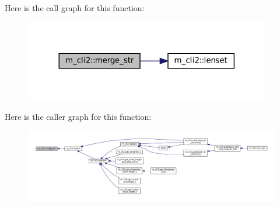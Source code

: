 Here is the call graph for this function\+:
\nopagebreak
\begin{figure}[H]
\begin{center}
\leavevmode
\includegraphics[width=305pt]{namespacem__cli2_a8e172feb2e4ae4d21d4fceb4e54f593c_cgraph}
\end{center}
\end{figure}
Here is the caller graph for this function\+:
\nopagebreak
\begin{figure}[H]
\begin{center}
\leavevmode
\includegraphics[width=350pt]{namespacem__cli2_a8e172feb2e4ae4d21d4fceb4e54f593c_icgraph}
\end{center}
\end{figure}
\mbox{\label{namespacem__cli2_a368e9aaa556f69228e7f0837bd558b82}} 
